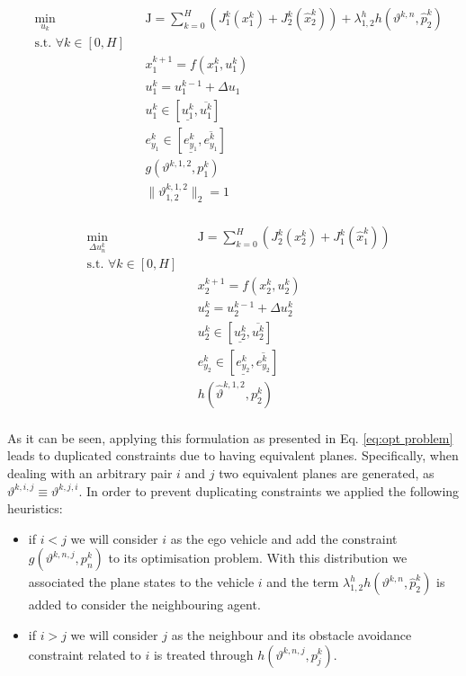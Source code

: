 \documentclass[a4paper,fleqn]{cas-sc}
\begin{document}
\begin{equation}
\label{eq:ego_agent}
\begin{aligned}
    & \underset{u_k}{\text{min}} && \mathrm{J}=\sum_{k=0}^{H} ( J^k_1(x^k_1) + J^k_2(\hat{x}^k_2)) + \lambda^h_{1,2}h(\vartheta^{k,n},\hat{p}^k_2)\\
    & \text{s.t. $\forall k \in [0,H]$}\\
    &&& x^{k+1}_1 = f(x^{k}_1,u^{k}_1)\\
    &&& u^k_1 = u^{k-1}_{1} + \Delta u_1 \\ 
    &&& u^k_1 \in [\underline{u^k_1}, \overline{u^k_1} ] \\
    &&& e_{y_{1}}^{k} \in [\underline{e_{y_{1}}^{k}}, \overline{e_{y_{1}}^{k}} ] \\
    &&&  g(\vartheta^{k,1,2},p^{k}_1)  \\
    &&& \lVert \vartheta^{k,1,2}_{1,2} \rVert_2 = 1 \\
\end{aligned}
\end{equation}

\begin{equation}
\label{eq:slave_agent}
\begin{aligned}
    & \underset{\Delta u^k_n}{\text{min}} && \mathrm{J}=\sum_{k=0}^{H} ( J^k_2(x^k_2) + J^k_1(\hat{x}^k_1)) \\
    & \text{s.t. $\forall k \in [0,H]$}\\
    &&& x^{k+1}_2 = f(x^{k}_2,u^{k}_2)\\
    &&& u^k_2 = u^{k-1}_{2} + \Delta u^k_2 \\ 
    &&& u^k_2 \in [\underline{u^k_2}, \overline{u^k_2} ] \\
    &&& e_{y_{2}}^{k} \in [\underline{e_{y_{2}}^{k}}, \overline{e_{y_{2}}^{k}} ] \\
    &&& h(\hat{\vartheta}^{k,1,2},p^{k}_2) \\
\end{aligned}
\end{equation}

As it can be seen, applying this formulation as presented in Eq. \eqref{eq:opt problem} leads to duplicated constraints due to having equivalent planes. Specifically, when dealing with an arbitrary pair $i$ and $j$ two equivalent planes are generated, as $\vartheta^{k,i,j} \equiv \vartheta^{k,j,i}$. In order to prevent duplicating constraints we applied the following heuristics:     
    
    \begin{itemize}
        \item if $i<j$ we will consider $i$ as the ego vehicle and add the constraint $g(\vartheta^{k,n,j},p^{k}_n)$ to its optimisation problem. With this distribution we associated the plane states to the vehicle $i$ and the term $\lambda^h_{1,2}h(\vartheta^{k,n},\hat{p}^k_2)$ is added to consider the neighbouring agent. 
        \item if $i>j$ we will consider $j$ as the neighbour and its obstacle avoidance constraint related to $i$ is treated through $h(\vartheta^{k,n,j},p^{k}_j)$. 
    \end{itemize}
\end{document}
